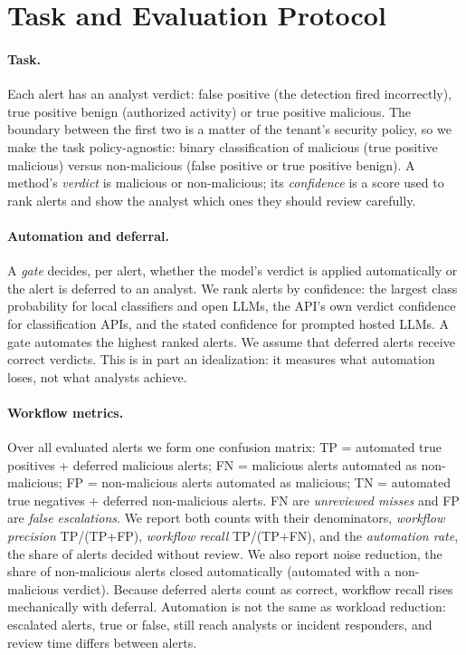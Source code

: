 \documentclass[letterpaper]{article} %
\begin{document}
\section{Task and Evaluation Protocol}

\paragraph{Task.} Each alert has an analyst verdict: false positive (the detection fired incorrectly), true positive benign (authorized activity) or true positive malicious. The boundary between the first two is a matter of the tenant's security policy, so we make the task policy-agnostic: binary classification of malicious (true positive malicious) versus non-malicious (false positive or true positive benign). A method's \emph{verdict} is malicious or non-malicious; its \emph{confidence} is a score used to rank alerts and show the analyst which ones they should review carefully.

\paragraph{Automation and deferral.} A \emph{gate} decides, per alert, whether the model's verdict is applied automatically or the alert is deferred to an analyst. We rank alerts by confidence: the largest class probability for local classifiers and open LLMs, the API's own verdict confidence for classification APIs, and the stated confidence for prompted hosted LLMs. A gate automates the highest ranked alerts. We assume that deferred alerts receive correct verdicts. This is in part an idealization: it measures what automation loses, not what analysts achieve.

\paragraph{Workflow metrics.} Over all evaluated alerts we form one confusion matrix: TP = automated true positives + deferred malicious alerts; FN = malicious alerts automated as non-malicious; FP = non-malicious alerts automated as malicious; TN = automated true negatives + deferred non-malicious alerts. FN are \emph{unreviewed misses} and FP are \emph{false escalations}. We report both counts with their denominators, \emph{workflow precision} TP/(TP+FP), \emph{workflow recall} TP/(TP+FN), and the \emph{automation rate}, the share of alerts decided without review. We also report noise reduction, the share of non-malicious alerts closed automatically (automated with a non-malicious verdict). Because deferred alerts count as correct, workflow recall rises mechanically with deferral. Automation is not the same as workload reduction: escalated alerts, true or false, still reach analysts or incident responders, and review time differs between alerts.
\end{document}
